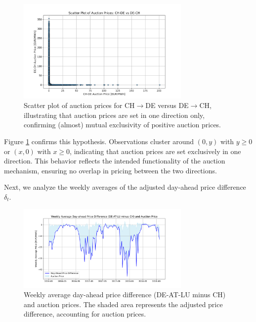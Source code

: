 \documentclass[12pt]{article}
\begin{document}
\begin{figure}[h!]
    \centering
    \includegraphics[width=0.75\textwidth]{figures/scatter_plot_ch_de_vs_de_ch_auction_prices.png}
    \caption{Scatter plot of auction prices for CH$\rightarrow$DE versus DE$\rightarrow$CH, illustrating that auction prices are set in one direction only, confirming (almost) mutual exclusivity of positive auction prices.}
    \label{fig:scatter_ch_de_auction}
\end{figure}

\noindent
Figure \ref{fig:scatter_ch_de_auction} confirms this hypothesis. Observations cluster around $(0, y)$ with $y \geq 0$ or $(x, 0)$ with $x \geq 0$, indicating that auction prices are set exclusively in one direction. This behavior reflects the intended functionality of the auction mechanism, ensuring no overlap in pricing between the two directions.

Next, we analyze the weekly averages of the adjusted day-ahead price difference $\delta_t$.

\begin{figure}[ht]
    \centering
    \includegraphics[width=0.75\textwidth]{figures/weekly_average_day_ahead_price_diff_de-lu-at_ch.png}
    \caption{Weekly average day-ahead price difference (DE-AT-LU minus CH) and auction prices. The shaded area represents the adjusted price difference, accounting for auction prices.}
    \label{fig:weekly_de_at_lu_ch}
\end{figure}
\end{document}

